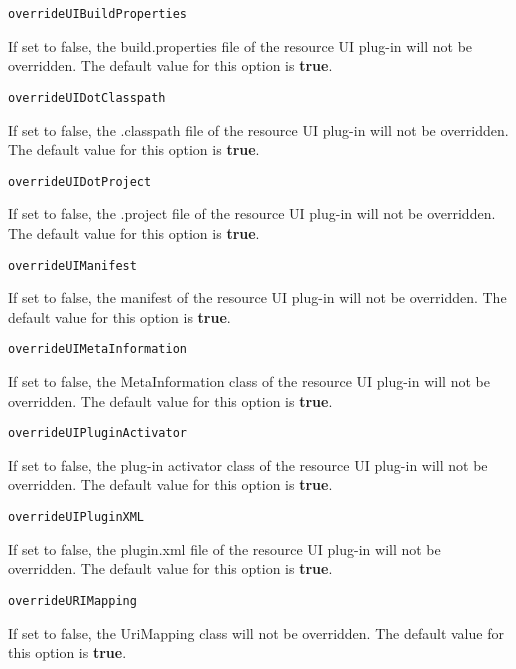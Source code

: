 \noindent\texttt{overrideUIBuildProperties}
\begin{myindentpar}{1cm}
If set to false, the build.properties file of the resource UI plug-in will not be overridden. The default value for this option is \textbf{true}.
\end{myindentpar}

\noindent\texttt{overrideUIDotClasspath}
\begin{myindentpar}{1cm}
If set to false, the .classpath file of the resource UI plug-in will not be overridden. The default value for this option is \textbf{true}.
\end{myindentpar}

\noindent\texttt{overrideUIDotProject}
\begin{myindentpar}{1cm}
If set to false, the .project file of the resource UI plug-in will not be overridden. The default value for this option is \textbf{true}.
\end{myindentpar}

\noindent\texttt{overrideUIManifest}
\begin{myindentpar}{1cm}
If set to false, the manifest of the resource UI plug-in will not be overridden. The default value for this option is \textbf{true}.
\end{myindentpar}

\noindent\texttt{overrideUIMetaInformation}
\begin{myindentpar}{1cm}
If set to false, the MetaInformation class of the resource UI plug-in will not be overridden. The default value for this option is \textbf{true}.
\end{myindentpar}

\noindent\texttt{overrideUIPluginActivator}
\begin{myindentpar}{1cm}
If set to false, the plug-in activator class of the resource UI plug-in will not be overridden. The default value for this option is \textbf{true}.
\end{myindentpar}

\noindent\texttt{overrideUIPluginXML}
\begin{myindentpar}{1cm}
If set to false, the plugin.xml file of the resource UI plug-in will not be overridden. The default value for this option is \textbf{true}.
\end{myindentpar}

\noindent\texttt{overrideURIMapping}
\begin{myindentpar}{1cm}
If set to false, the UriMapping class will not be overridden. The default value for this option is \textbf{true}.
\end{myindentpar}

